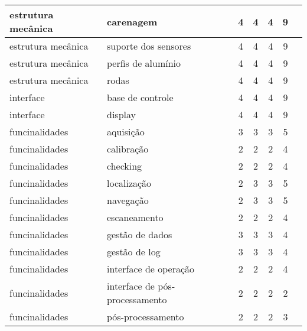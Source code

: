 \begin{table}[h]
\begin{tabular}{llccccl}
estrutura mecânica			& carenagem							& 4	 & 4  & 4	& 9	  & \cellcolor[HTML]{009901}\\ \hline
estrutura mecânica			& suporte dos sensores				& 4	 & 4  & 4	& 9	  & \cellcolor[HTML]{009901}\\ \hline
estrutura mecânica			& perfis de alumínio					& 4	 & 4  & 4	& 9	  & \cellcolor[HTML]{009901}\\ \hline
estrutura mecânica			& rodas								& 4	 & 4  & 4	& 9	  & \cellcolor[HTML]{009901}\\ \hline
interface					& base de controle					& 4	 & 4  & 4	& 9	  & \cellcolor[HTML]{009901}\\ \hline
interface					& display							& 4	 & 4  & 4	& 9	  & \cellcolor[HTML]{009901}\\ \hline
funcinalidades				& aquisição							& 3	 & 3  & 3	& 5	  & \cellcolor[HTML]{F8FF00}\\ \hline
funcinalidades				& calibração							& 2	 & 2  & 2	& 4	  & \cellcolor[HTML]{F56B00}\\ \hline
funcinalidades				& checking							& 2	 & 2  & 2	& 4	  & \cellcolor[HTML]{F56B00}\\ \hline
funcinalidades				& localização						& 2	 & 3  & 3	& 5	  & \cellcolor[HTML]{F8FF00}\\ \hline
funcinalidades				& navegação							& 2	 & 3  & 3	& 5	  & \cellcolor[HTML]{F8FF00}\\ \hline
funcinalidades				& escaneamento						& 2	 & 2  & 2	& 4	  & \cellcolor[HTML]{F56B00}\\ \hline
funcinalidades				& gestão de dados					& 3	 & 3  & 3	& 4	  & \cellcolor[HTML]{F56B00}\\ \hline
funcinalidades				& gestão de log						& 3	 & 3  & 3   & 4	  & \cellcolor[HTML]{F56B00}\\ \hline
funcinalidades				& interface de operação				& 2	 & 2  & 2	& 4	  & \cellcolor[HTML]{F56B00}\\ \hline
funcinalidades				& interface de pós-processamento		& 2	 & 2  & 2	& 2	  & \cellcolor[HTML]{9A0000}\\ \hline
funcinalidades				& pós-processamento					& 2	 & 2  & 2	& 3	  & \cellcolor[HTML]{9A0000}\\ \hline
\end{tabular}
\end{table}

